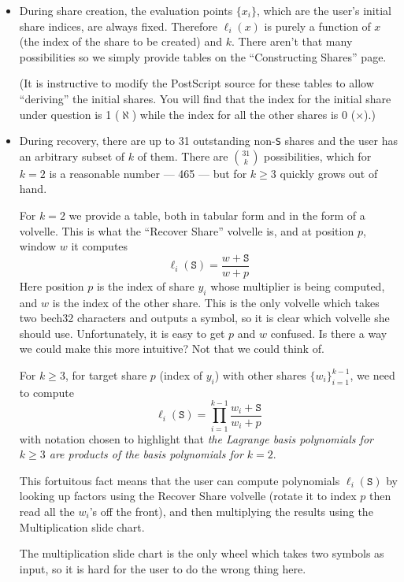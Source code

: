 \documentclass[letterpaper]{article}
\theoremstyle{xxx}
\theoremstyle{evil}
\theoremstyle{yyy}
\theoremstyle{plain}
\theoremstyle{zzz}
\newcommand{\vc}[1]{\texttt{#1}} %
\begin{document}
\begin{itemize}
\item During share creation, the evaluation points $\{x_i\}$, which are the
user's initial share indices, are always fixed. Therefore $\ell_i(x)$ is purely
a function of $x$ (the index of the share to be created) and $k$. There aren't
that many possibilities so we simply provide tables on the ``Constructing Shares''
page.

(It is instructive to modify the PostScript source for these tables to allow
``deriving'' the initial shares. You will find that the index for the initial
share under question is 1 ($\aleph$) while the index for all the other shares
is 0 ($\times$).)

\item During recovery, there are up to 31 outstanding non-\vc{S} shares and
the user has an arbitrary subset of $k$ of them. There are $\binom{31}k$
possibilities, which for $k=2$ is a reasonable number --- 465 --- but for
$k\geq3$ quickly grows out of hand.

For $k = 2$ we provide a table, both in tabular form and in the form of a volvelle.
This is what the ``Recover Share'' volvelle is, and at position $p$, window $w$ it
computes
\[ \ell_i(\vc{S}) = \frac{w + \vc{S}}{w + p} \]
Here position $p$ is the index of share $y_i$ whose multiplier is being computed,
and $w$ is the index of the other share. This is the only volvelle which takes two
bech32 characters and outputs a symbol, so it is clear which volvelle she should
use. Unfortunately, it is easy to get $p$ and $w$ confused. Is there a way we
could make this more intuitive? Not that we could think of.

For $k \geq 3$, for target share $p$ (index of $y_i$) with other shares
$\{w_i\}_{i=1}^{k-1}$, we need to compute
\[ \ell_i(\vc{S}) = \prod_{i=1}^{k-1} \frac{w_i + \vc{S}}{w_i + p} \]
with notation chosen to highlight that \emph{the Lagrange basis polynomials for
$k\geq3$ are products of the basis polynomials for $k=2$}.

This fortuitous fact means that the user can compute polynomials $\ell_i(\vc{S})$
by looking up factors using the Recover Share volvelle (rotate it to index $p$ then
read all the $w_i$'s off the front), and then multiplying the
results using the Multiplication slide chart.

The multiplication slide chart is the only wheel which takes two symbols as input,
so it is hard for the user to do the wrong thing here.
\end{itemize}
\end{document}
